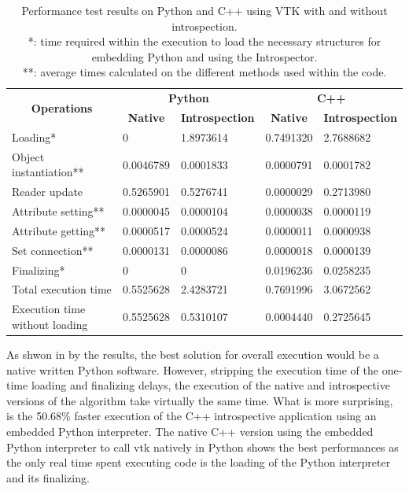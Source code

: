 \begin{table}[]
    \centering
    \begin{tabular}{lllll}
    \hline
    \multicolumn{1}{c}{\multirow{2}{*}{\textbf{Operations}}} &
      \multicolumn{2}{c}{\textbf{Python}} &
      \multicolumn{2}{c}{\textbf{C++}} \\ 
    \multicolumn{1}{c}{} &
      \multicolumn{1}{c}{\textbf{Native}} &
      \multicolumn{1}{c}{\textbf{Introspection}} &
      \multicolumn{1}{c}{\textbf{Native}} &
      \multicolumn{1}{c}{\textbf{Introspection}} \\ \hhline{=====}
    Loading*                       & \multicolumn{1}{l}{0}         & 1.8973614 & 0.7491320 & 2.7688682 \\
    Object instantiation**         & \multicolumn{1}{l}{0.0046789} & 0.0001833 & 0.0000791 & 0.0001782 \\
    Reader update                  & \multicolumn{1}{l}{0.5265901} & 0.5276741 & 0.0000029 & 0.2713980 \\
    Attribute setting**            & \multicolumn{1}{l}{0.0000045} & 0.0000104 & 0.0000038 & 0.0000119 \\
    Attribute getting**            & \multicolumn{1}{l}{0.0000517} & 0.0000524 & 0.0000011 & 0.0000938 \\
    Set connection**               & \multicolumn{1}{l}{0.0000131} & 0.0000086 & 0.0000018 & 0.0000139 \\
    Finalizing*                    & \multicolumn{1}{l}{0}         & 0         & 0.0196236 & 0.0258235 \\ \hline
    Total execution time           & \multicolumn{1}{l}{0.5525628} & 2.4283721 & 0.7691996 & 3.0672562 \\ \hline
    Execution time without loading & \multicolumn{1}{l}{0.5525628} & 0.5310107 & 0.0004440 & 0.2725645 \\ \hline
    \end{tabular}
    \caption{Performance test results on Python and C++ using VTK with and without introspection.\\
    *: time required within the execution to load the necessary structures for embedding Python and using the Introspector.\\
    **: average times calculated on the different methods used within the code.}
    \label{tab:streamtracer-performance-tests-results}
\end{table}

As shwon in by the results, the best solution for overall execution would be a native written Python software. However, stripping the execution time of the one-time loading and finalizing delays, the execution of the native and introspective versions of the algorithm take virtually the same time. What is more surprising, is the 50.68\% faster execution of the C++ introspective application using an embedded Python interpreter. The native C++ version using the embedded Python interpreter to call \acrshort{vtk} natively in Python shows the best performances as the only real time spent executing code is the loading of the Python interpreter and its finalizing.

